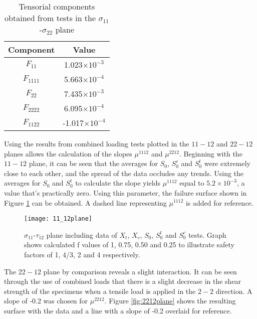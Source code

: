 \documentclass[main.tex]{subfiles}
\begin{document}
\begin{table} [h]
	\centering
	\caption{Tensorial components obtained from tests in the $\sigma_{11}$-$\sigma_{22}$ plane}
	\begin{tabular}{ c c } 
		\toprule
		\textbf{Component} & \textbf{Value} \\
		\midrule
		$F_{11}$ & 1.023$\times 10^{-3}$\\ 
		$F_{1111}$ & 5.663$\times 10^{-4}$\\ 
		$F_{22}$ & 7.435$\times 10^{-3}$\\ 
		$F_{2222}$ & 6.095$\times 10^{-4}$\\ 
		$F_{1122}$ & -1.017$\times 10^{-4}$\\ 
		\bottomrule
	\end{tabular}
	\label{tab:1122calc}
\end{table}  

Using the results from combined loading tests plotted in the $11-12$ and $22-12$ planes allows the calculation of the slopes $\mu^{1112}$ and  $\mu^{2212}$. Beginning with the $11-12$ plane, it can be seen that the averages for $S_{0}$, $S_{0}^c$  and $S_{0}^t$ were extremely close to each other, and the spread of the data occludes any trends. Using the averages for $S_{0}$ and $S_{0}^t$ to calculate the slope yields $\mu^{1112}$ equal to $5.2\times 10^{-3}$, a value that's practically zero. Using this parameter, the failure surface shown in Figure \ref{fig:1112plane} can be obtained. A dashed line representing $\mu^{1112}$ is added for reference.

\pagebreak

\begin{figure}[!htbp]
	\center
	\texttt{[image: 11\_12plane]}
	\captionsetup{justification=centering} %
	\caption[failure envelope in the $\sigma_{11}$-$\tau_{12}$ plane]{$\sigma_{11}$-$\tau_{12}$ plane including data of $X_t$, $X_c$, $S_{0}$, $S_{0}^t$ and $S_{0}^c$ tests. Graph shows calculated f values of 1, 0.75, 0.50 and 0.25 to illustrate safety factors of 1, 4/3, 2 and 4 respectively.} \label{fig:1112plane}
\end{figure}

The $22-12$ plane by comparison reveals a slight interaction. It can be seen through the use of combined loads that there is a slight decrease in the shear strength of the specimens when a tensile load is applied in the $2-2$ direction. A slope of -0.2 was chosen for $\mu^{2212}$. Figure \ref{fig:2212plane} shows the resulting surface with the data and a line with a slope of -0.2 overlaid for reference.
\end{document}
